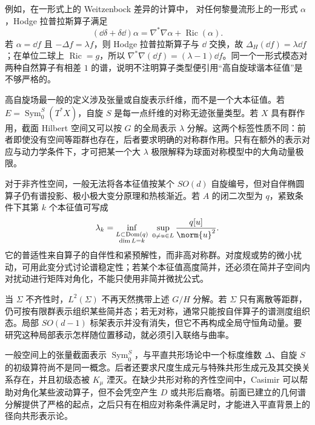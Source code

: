 例如，在一形式上的 Weitzenbock 差异的计算中，
对任何黎曼流形上的一形式 $\alpha$，Hodge 拉普拉斯算子满足
\begin{equation}\label{eq:ghs-r6-weitzenbock-oneform}
(\dd\delta+\delta\dd)\alpha=\nabla^*\nabla\alpha+\operatorname{Ric}(\alpha).
\end{equation}
若 $\alpha=\dd f$ 且 $-\Delta f=\lambda f$，则 Hodge 拉普拉斯算子与 $\dd$ 交换，故 $\Delta_H(\dd f)=\lambda\dd f$；在单位二球上 $\operatorname{Ric}=g$，所以 $\nabla^*\nabla(\dd f)=(\lambda-1)\dd f$。同一个一形式模态对两种自然算子有相差 $1$ 的谱，说明不注明算子类型便引用“高自旋球谐本征值”是不够严格的。

高自旋场最一般的定义涉及张量或自旋表示纤维，而不是一个大本征值。若 $E=\operatorname{Sym}_0^S(T^*X)$，自旋 $S$ 是每一点纤维的对称无迹张量类型。若 $X$ 具有群作用，截面 Hilbert 空间又可以按 $G$ 的全局表示 $\lambda$ 分解。这两个标签性质不同：前者即使没有空间等距群也存在，后者要求明确的对称群作用。只有在额外的表示对应与动力学条件下，才可把某一个大 $\lambda$ 极限解释为球面对称模型中的大角动量极限。

对于非齐性空间，一般无法将各本征值按某个 $SO(d)$ 自旋编号，但对自伴椭圆算子仍有谱投影、极小极大变分原理和热核渐近。若 $A$ 的闭二次型为 $q$，紧致条件下其第 $k$ 个本征值可写成
\begin{equation}\label{eq:ghs-r6-minmax-eigen}
\lambda_k=\inf_{\substack{L\subset\operatorname{Dom}(q)\\\dim L=k}}
\ \sup_{\substack{0\ne u\in L}}\frac{q[u]}{\norm{u}^2}.
\end{equation}
它的普适性来自算子的自伴性和紧预解性，而非高对称群。对度规或势的微小扰动，可用此变分式讨论谱稳定性；若某个本征值高度简并，还必须在简并子空间内对扰动进行矩阵对角化，不能只使用非简并微扰公式。

当 $\Sigma$ 不齐性时，$L^2(\Sigma)$ 不再天然携带上述 $G/H$ 分解。若 $\Sigma$ 只有离散等距群，仍可按有限群表示组织某些简并态；若无对称，通常只能按自伴算子的谱测度组织态。局部 $SO(d-1)$ 标架表示并没有消失，但它不再构成全局守恒角动量。要研究这种局部表示怎样随位置移动，就必须引入联络与曲率。

一般空间上的张量截面表示 $\operatorname{Sym}_0^S$，与平直共形场论中一个标度维数 $\Delta$、自旋 $S$ 的初级算符尚不是同一概念。后者还要求尺度生成元与特殊共形生成元及其交换关系存在，并且初级态被 $K_\mu$ 湮灭。在缺少共形对称的齐性空间中，Casimir 可以帮助对角化某些波动算子，但不会凭空产生 $D$ 或共形后裔塔。前面已建立的几何谱分解提供了严格的起点，之后只有在相应对称条件满足时，才能进入平直背景上的径向共形表示论。

